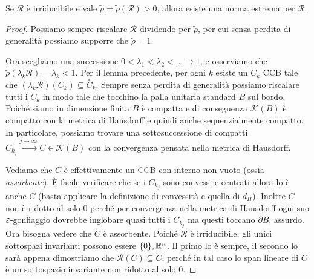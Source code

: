 \begin{teorema}
	Se $\mathcal R$ è irriducibile e vale $\tilde\rho = \tilde\rho(\mathcal R)>0$, allora esiste una norma estrema per $\mathcal R$.
\end{teorema}
\begin{proof}
	Possiamo sempre riscalare $\mathcal R$ dividendo per $\tilde\rho$, per cui senza perdita di generalità possiamo supporre che $\tilde\rho = 1$.
	
	Ora scegliamo una successione $0<\lambda_{1}<\lambda_{2}<\dots\to1$, e osserviamo che $\tilde\rho(\lambda_{k}\mathcal R) = \lambda_{k} <1$. 
	Per il lemma precedente, per ogni $k$ esiste un $C_{k}$ CCB tale che $(\lambda_{k}\mathcal R)(C_{k})\subseteq\overset{\circ}C_{k}$.
	Sempre senza perdita di generalità possiamo riscalare tutti i $C_{k}$ in modo tale che tocchino la palla unitaria standard $B$ sul bordo. 
	Poiché siamo in dimensione finita $B$ è compatta e di conseguenza $\mathcal K(B)$ è compatto con la metrica di Hausdorff e quindi anche sequenzialmente compatto. In particolare, possiamo trovare una sottosuccessione di compatti $C_{k_{j}}\xrightarrow[]{j\to\infty} C\in\mathcal K(B)$ con la convergenza pensata nella metrica di Hausdorff. 
	
	Vediamo che $C$ è effettivamente un CCB con interno non vuoto (ossia \emph{assorbente}).
	È facile verificare che se i $C_{k_{j}}$ sono convessi e centrati allora lo è anche $C$ (basta applicare la definizione di convessità e quella di $d_{H}$).
	Inoltre $C$ non è ridotto al solo $0$ perché per convergenza nella metrica di Hausdorff ogni suo $\varepsilon$-gonfiaggio dovrebbe inglobare quasi tutti i $C_{k_{j}}$ ma questi toccano $\partial B$, assurdo.
	Ora bisogna vedere che $C$ è assorbente. 
	Poiché $\mathcal R$ è irriducibile, gli unici sottospazi invarianti possono essere $\{0\}, \mathbb{R}^{n}$. Il primo lo è sempre, il secondo %
	lo sarà appena dimostriamo che $\mathcal R(C)\subseteq C$, perché in tal caso lo span lineare di $C$ è un sottospazio invariante non ridotto al solo 0.
	

\end{proof}
